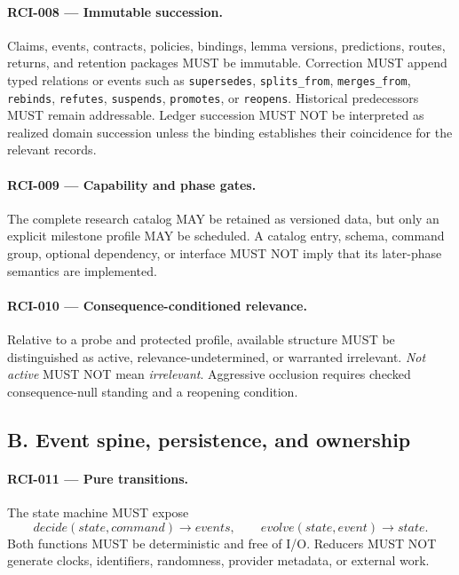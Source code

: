 \documentclass[11pt]{article}
\begin{document}
\paragraph{RCI-008 --- Immutable succession.}
Claims, events, contracts, policies, bindings, lemma versions, predictions,
routes, returns, and retention packages MUST be immutable. Correction MUST
append typed relations or events such as \texttt{supersedes},
\texttt{splits\_from}, \texttt{merges\_from}, \texttt{rebinds},
\texttt{refutes}, \texttt{suspends}, \texttt{promotes}, or
\texttt{reopens}. Historical predecessors MUST remain addressable.
Ledger succession MUST NOT be interpreted as realized domain succession unless
the binding establishes their coincidence for the relevant records.

\paragraph{RCI-009 --- Capability and phase gates.}
The complete research catalog MAY be retained as versioned data, but only an
explicit milestone profile MAY be scheduled. A catalog entry, schema, command
group, optional dependency, or interface MUST NOT imply that its later-phase
semantics are implemented.

\paragraph{RCI-010 --- Consequence-conditioned relevance.}
Relative to a probe and protected profile, available structure MUST be
distinguished as active, relevance-undetermined, or warranted irrelevant.
\emph{Not active} MUST NOT mean \emph{irrelevant}. Aggressive occlusion requires
checked consequence-null standing and a reopening condition.

\subsection{B. Event spine, persistence, and ownership}

\paragraph{RCI-011 --- Pure transitions.}
The state machine MUST expose
\[
  decide(state,command)\rightarrow events,\qquad
  evolve(state,event)\rightarrow state.
\]
Both functions MUST be deterministic and free of I/O. Reducers MUST NOT
generate clocks, identifiers, randomness, provider metadata, or external work.
\end{document}
